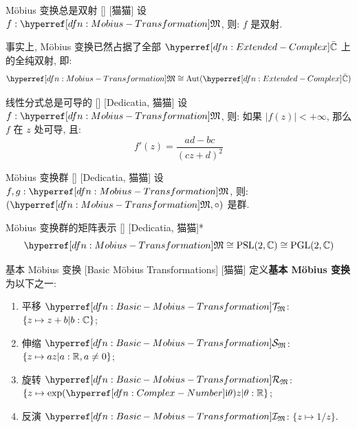         \begin{ppt}
            {M\"obius 变换总是双射}
            []
            [猫猫]
            设 \(f:\Mobius\), 则: \(f\) 是双射. 
        \end{ppt}
        
        \begin{rmk}
            [猫猫]
            事实上, M\"obius 变换已然占据了全部 \(\barC\) 上的全纯双射, 即: 
            \[\Mobius\cong\Aut(\barC)\]
        \end{rmk}

        \begin{ppt}
            {线性分式总是可导的}
            []
            [Dedicatia, 猫猫]
            设 \(f:\Mobius\), 则: 如果 \(|f(z)|<+\infty\), 那么 \(f\) 在 \(z\) 处可导, 且:
            \[f'(z)=\frac{ad-bc}{(cz+d)^2}\]
        \end{ppt}
        
        \begin{ppt}
            {M\"obius 变换群}
            []
            [Dedicatia, 猫猫]
            设 \(f, g:\Mobius\), 则: \((\Mobius,\circ)\) 是群. 
        \end{ppt}

        \begin{ppt}
            {M\"obius 变换群的矩阵表示}
            []
            [Dedicatia, 猫猫]*
            \[\Mobius\cong\operatorname{PSL}(2,\C)\cong\operatorname{PGL}(2,\C)\]
        \end{ppt}
        
        \begin{dfn}
            {基本 M\"obius 变换}
            [Basic M\"obius Transformations]
            [猫猫]
            定义\textbf{基本 M\"obius 变换}为以下之一: 
            \begin{enumerate}
                \item 平移 \(\CTranslation\): \(\{z\mapsto z+b|b:\operatorname{\mathbb{C}}\}\); 
                \item 伸缩 \(\CScaling\): \(\{z\mapsto az|a:\operatorname{\mathbb{R}}, a\neq 0\}\); 
                \item 旋转 \(\CRotation\): \(\{z\mapsto \exp(\ii\theta)z|\theta:\R\}\); 
                \item 反演 \(\CInversion\): \(\{z\mapsto 1/z\}\).
            \end{enumerate}
        \end{dfn}

